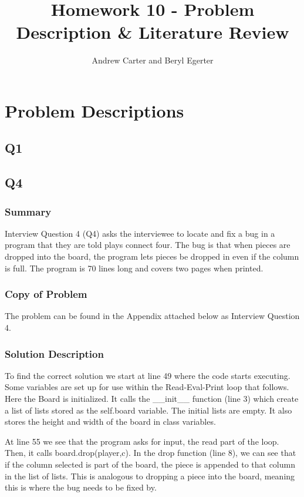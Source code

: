 \documentclass{article}
\title{Homework 10 - Problem Description \& Literature Review}
\author{Andrew Carter and Beryl Egerter}
\begin{document}
\maketitle
\section{Problem Descriptions}

\subsection{Q1}

\newpage
\subsection{Q4}
\subsubsection{Summary}
Interview Question 4 (Q4) asks the interviewee to locate and fix a bug in a program that they are told plays connect four. The bug is that when pieces are dropped into the board, the program lets pieces be dropped in even if the column is full. The program is 70 lines long and covers two pages when printed.
\subsubsection{Copy of Problem}
The problem can be found in the Appendix attached below as Interview Question 4.

\subsubsection{Solution Description}
To find the correct solution we start at line 49 where the code starts executing. Some variables are set up for use within the Read-Eval-Print loop that follows. Here the Board is initialized. It calls the \_\_init\_\_ function (line 3) which create a list of lists stored as the self.board variable. The initial lists are empty. It also stores the height and width of the board in class variables. 

At line 55 we see that the program asks for input, the read part of the loop. Then, it calls board.drop(player,c). In the drop function (line 8), we can see that if the column selected is part of the board, the piece is appended to that column in the list of lists. This is analogous to dropping a piece into the board, meaning this is where the bug needs to be fixed by.
\end{document}
